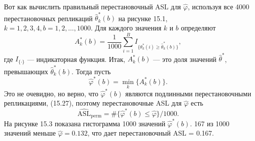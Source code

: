Вот как вычислить правильный перестановочный ASL для $\hat{\varphi}$, используя все 4000 перестановочных репликаций $\hat{\theta}^*_k (b)$ на рисунке 15.1, $k = 1, 2, 3, 4, b = 1, 2, \ldots, 1000$. Для каждого значения $k$ и $b$ определяют
\begin{equation}
	A^*_k(b) = \dfrac{1}{1000} \sum\limits_{i=1}^{B} I_{\{\theta^*_k(i) \geq \hat{\theta}^*_k(b)\}},
\end{equation}
где $I_{\{ \cdot \}}$ --- индикаторная функция. Итак, $A^*_k(b)$ --- это доля значений $\hat{\theta}^*$, превышающих $\hat{\theta}^*_k(b)$. Тогда пусть
\begin{equation}
	\hat{\varphi}^*(b) = \min_k \{ A^*_k (b) \}.
\end{equation}
Это не очевидно, но верно, что $\hat{\varphi}^*(b)$ являются подлинными перестановочными репликациями, (15.27), поэтому перестановочные ASL для $\hat{\varphi}$ есть
\begin{equation}
	\widehat{\text{ASL}}_{\text{perm}} = \# \{ \hat{\varphi}^*(b) \leq \hat{\varphi} \} / 1000.
\end{equation}
На рисунке 15.3 показана гистограмма 1000 значений $\hat{\varphi}^*(b)$. 167 из 1000 значений меньше $\hat{\varphi} = 0.132$, что дает перестановочный ASL = 0.167.